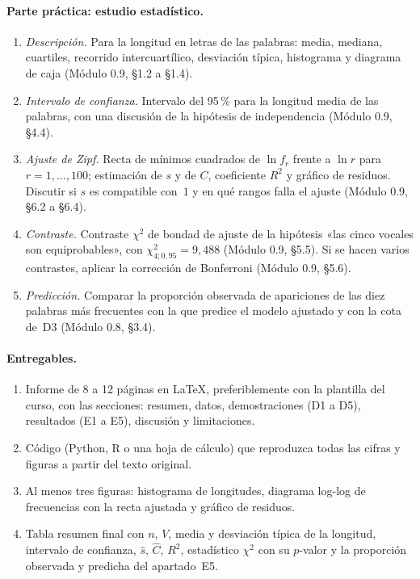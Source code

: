 \paragraph{Parte práctica: estudio estadístico.}
\begin{enumerate}[label=E\arabic*.]
  \item \emph{Descripción.} Para la longitud en letras de las palabras: media, mediana, cuartiles, recorrido intercuartílico, desviación típica, histograma y diagrama de caja (Módulo 0.9, §1.2 a §1.4).
  \item \emph{Intervalo de confianza.} Intervalo del 95\,\% para la longitud media de las palabras, con una discusión de la hipótesis de independencia (Módulo 0.9, §4.4).
  \item \emph{Ajuste de Zipf.} Recta de mínimos cuadrados de $\ln f_r$ frente a $\ln r$ para $r=1,\dots,100$; estimación de $s$ y de $C$, coeficiente $R^{2}$ y gráfico de residuos. Discutir si $s$ es compatible con~$1$ y en qué rangos falla el ajuste (Módulo 0.9, §6.2 a §6.4).
  \item \emph{Contraste.} Contraste $\chi^{2}$ de bondad de ajuste de la hipótesis «las cinco vocales son equiprobables», con $\chi^{2}_{4;0{,}95}=9{,}488$ (Módulo 0.9, §5.5). Si se hacen varios contrastes, aplicar la corrección de Bonferroni (Módulo 0.9, §5.6).
  \item \emph{Predicción.} Comparar la proporción observada de apariciones de las diez palabras más frecuentes con la que predice el modelo ajustado y con la cota de~D3 (Módulo 0.8, §3.4).
\end{enumerate}

\paragraph{Entregables.}
\begin{enumerate}[label=\arabic*.]
  \item Informe de 8 a 12 páginas en \LaTeX, preferiblemente con la plantilla del curso, con las secciones: resumen, datos, demostraciones (D1 a D5), resultados (E1 a E5), discusión y limitaciones.
  \item Código (Python, R o una hoja de cálculo) que reproduzca todas las cifras y figuras a partir del texto original.
  \item Al menos tres figuras: histograma de longitudes, diagrama log-log de frecuencias con la recta ajustada y gráfico de residuos.
  \item Tabla resumen final con $n$, $V$, media y desviación típica de la longitud, intervalo de confianza, $\widehat s$, $\widehat C$, $R^{2}$, estadístico $\chi^{2}$ con su $p$-valor y la proporción observada y predicha del apartado~E5.
\end{enumerate}

